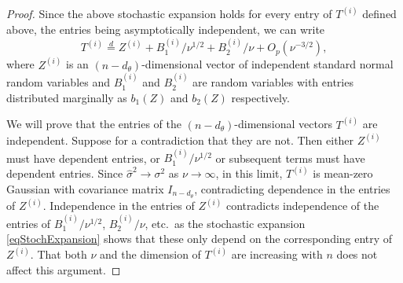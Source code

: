 \documentclass[10pt, reqno]{amsart}
\numberwithin{equation}{section}
\begin{document}
\begin{appendix}
\begin{proof}
	Since the above stochastic expansion holds for every entry of $T^{(i)}$ defined above, the entries being asymptotically independent, we can write 
	\begin{equation}\label{eqTZExpansion}
		T^{(i)}\stackrel{d}{=}Z^{(i)} +  B_1^{(i)}/\nu^{1/2} + B_2^{(i)}/\nu + O_p(\nu^{-3/2}),
	\end{equation}
	where $Z^{(i)}$ is an $(n-d_\theta)$-dimensional vector of independent standard normal random variables and $B_1^{(i)}$ and $B_2^{(i)}$ are random variables with entries distributed marginally as $b_1(Z)$ and $b_2(Z)$ respectively. 
	
	We will prove that the entries of the $(n-d_\theta)$-dimensional vectors $T^{(i)}$ are independent. Suppose for a contradiction that they are not. Then either $Z^{(i)}$ must have dependent entries, or $B_1^{(i)}/\nu^{1/2}$ or subsequent terms must have dependent entries. Since $\hat{\sigma}^2\rightarrow \sigma^2$ as $\nu\rightarrow \infty$, in this limit, $T^{(i)}$ is mean-zero Gaussian with covariance matrix $I_{n-d_\theta}$, contradicting dependence in the entries of $Z^{(i)}$. Independence in the entries of $Z^{(i)}$ contradicts independence of the entries of $B_1^{(i)}/\nu^{1/2}$, $B_2^{(i)}/\nu$, etc.~as the stochastic expansion \eqref{eqStochExpansion} shows that these only depend on the corresponding entry of $Z^{(i)}$. That both $\nu$ and the dimension of $T^{(i)}$ are increasing with $n$ does not affect this argument. 
	
	
	

\end{proof}
\end{appendix}
\end{document}
